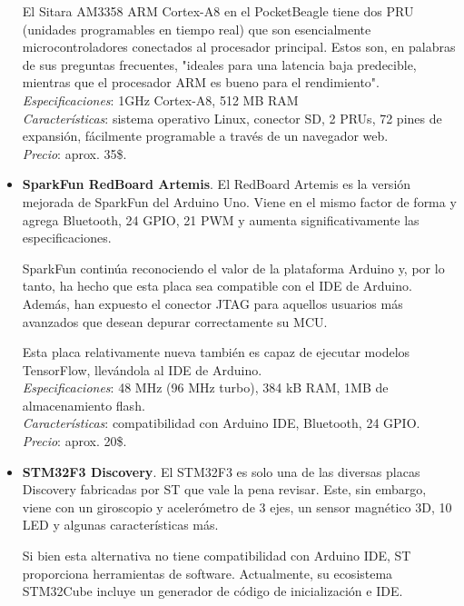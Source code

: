 \documentclass[12pt]{article}
\begin{document}
\begin{itemize}
		El Sitara AM3358 ARM Cortex-A8 en el PocketBeagle tiene dos PRU (unidades programables en tiempo real) que son esencialmente microcontroladores conectados al procesador principal. Estos son, en palabras de sus preguntas frecuentes, "ideales para una latencia baja predecible, mientras que el procesador ARM es bueno para el rendimiento". \\
		
		\textit{Especificaciones}: 1GHz Cortex-A8, 512 MB RAM\\
		
		\textit{Características}: sistema operativo Linux, conector SD, 2 PRUs, 72 pines de expansión, fácilmente programable a través de un navegador web.\\
		
		\textit{Precio}: aprox. 35\$. \\
		
		\item \textbf{SparkFun RedBoard Artemis}. El RedBoard Artemis es la versión mejorada de SparkFun del Arduino Uno. Viene en el mismo factor de forma y agrega Bluetooth, 24 GPIO, 21 PWM y aumenta significativamente las especificaciones.
		
		SparkFun continúa reconociendo el valor de la plataforma Arduino y, por lo tanto, ha hecho que esta placa sea compatible con el IDE de Arduino. Además, han expuesto el conector JTAG para aquellos usuarios más avanzados que desean depurar correctamente su MCU.
		
		Esta placa relativamente nueva también es capaz de ejecutar modelos TensorFlow, llevándola al IDE de Arduino.  \\
		
		\textit{Especificaciones}: 48 MHz (96 MHz turbo), 384 kB RAM, 1MB de almacenamiento flash. \\
		
		\textit{Características}: compatibilidad con Arduino IDE, Bluetooth, 24 GPIO.\\
		
		\textit{Precio}: aprox. 20\$.\\
		
		\item \textbf{STM32F3 Discovery}. El STM32F3 es solo una de las diversas placas Discovery fabricadas por ST que vale la pena revisar. Este, sin embargo, viene con un giroscopio y acelerómetro de 3 ejes, un sensor magnético 3D, 10 LED y algunas características más.
		
		Si bien esta alternativa no tiene compatibilidad con Arduino IDE, ST proporciona herramientas de software. Actualmente, su ecosistema STM32Cube incluye un generador de código de inicialización e IDE. \\
		

\end{itemize}
\end{document}
